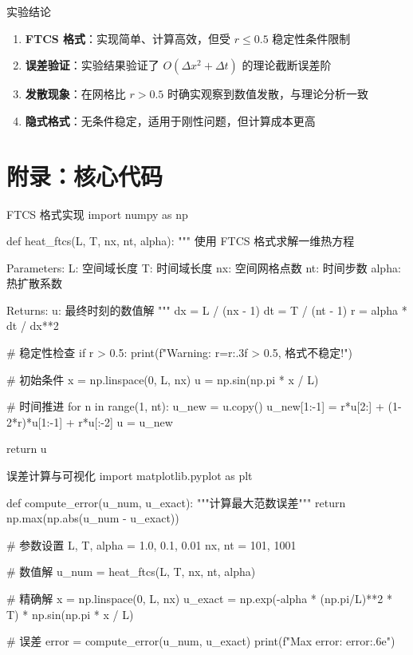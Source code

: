 \documentclass[linux, report,review]{mindflow}
\begin{document}
\begin{conclusion}{实验结论}
    \begin{enumerate}
        \item \textbf{FTCS 格式}：实现简单、计算高效，但受 $r \le 0.5$ 稳定性条件限制
        \item \textbf{误差验证}：实验结果验证了 $O(\Delta x^2 + \Delta t)$ 的理论截断误差阶
        \item \textbf{发散现象}：在网格比 $r > 0.5$ 时确实观察到数值发散，与理论分析一致
        \item \textbf{隐式格式}：无条件稳定，适用于刚性问题，但计算成本更高
    \end{enumerate}
\end{conclusion}


\section{附录：核心代码}

\begin{codeblock}[python]{FTCS 格式实现}
import numpy as np

def heat_ftcs(L, T, nx, nt, alpha):
    """
    使用 FTCS 格式求解一维热方程
    
    Parameters:
        L: 空间域长度
        T: 时间域长度  
        nx: 空间网格点数
        nt: 时间步数
        alpha: 热扩散系数
    
    Returns:
        u: 最终时刻的数值解
    """
    dx = L / (nx - 1)
    dt = T / (nt - 1)
    r = alpha * dt / dx**2
    
    # 稳定性检查
    if r > 0.5:
        print(f"Warning: r={r:.3f} > 0.5, 格式不稳定!")
    
    # 初始条件
    x = np.linspace(0, L, nx)
    u = np.sin(np.pi * x / L)
    
    # 时间推进
    for n in range(1, nt):
        u_new = u.copy()
        u_new[1:-1] = r*u[2:] + (1-2*r)*u[1:-1] + r*u[:-2]
        u = u_new
    
    return u
\end{codeblock}

\begin{codeblock}[python]{误差计算与可视化}
import matplotlib.pyplot as plt

def compute_error(u_num, u_exact):
    """计算最大范数误差"""
    return np.max(np.abs(u_num - u_exact))

# 参数设置
L, T, alpha = 1.0, 0.1, 0.01
nx, nt = 101, 1001

# 数值解
u_num = heat_ftcs(L, T, nx, nt, alpha)

# 精确解
x = np.linspace(0, L, nx)
u_exact = np.exp(-alpha * (np.pi/L)**2 * T) * np.sin(np.pi * x / L)

# 误差
error = compute_error(u_num, u_exact)
print(f"Max error: {error:.6e}")
\end{codeblock}

\end{document}
